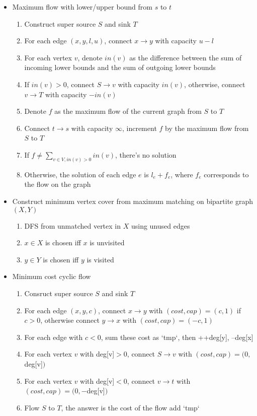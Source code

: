 \begin{itemize}
    \item Maximum flow with lower/upper bound from $s$ to $t$
    \begin{enumerate}
        \item Construct super source $S$ and sink $T$
        \item For each edge $(x, y, l, u)$, connect $x \rightarrow y$ with capacity $u - l$
        \item For each vertex $v$, denote $in(v)$ as the difference between the sum of incoming lower bounds and the sum of outgoing lower bounds
        \item If $in(v) > 0$, connect $S \rightarrow v$ with capacity $in(v)$, otherwise, connect $v \rightarrow T$ with capacity $-in(v)$
        \item Denote $f$ as the maximum flow of the current graph from $S$ to $T$
        \item Connect $t \rightarrow s$ with capacity $\infty$, increment $f$ by the maximum flow from $S$ to $T$
        \item If $f \neq \sum_{v \in V, in(v) > 0}{in(v)}$, there's no solution
        \item Otherwise, the solution of each edge $e$ is $l_e + f_e$, where $f_e$ corresponds to the flow on the graph
    \end{enumerate}
    \item Construct minimum vertex cover from maximum matching on bipartite graph $(X, Y)$
    \begin{enumerate}
        \item DFS from unmatched vertex in $X$ using unused edges
        \item $x \in X$ is chosen iff $x$ is unvisited
        \item $y \in Y$ is chosen iff $y$ is visited
    \end{enumerate}
    \item Minimum cost cyclic flow
    \begin{enumerate}
        \item Consruct super source $S$ and sink $T$
        \item For each edge $(x, y, c)$, connect $x \rightarrow y$ with $(cost, cap) = (c, 1)$ if $c > 0$, otherwise connect $y \rightarrow x$ with $(cost, cap) = (-c, 1)$
        \item For each edge with $c < 0$, sum these cost as `tmp`, then ++deg[y], --deg[x]
        \item For each vertex $v$ with deg[v]$> 0$, connect $S \rightarrow v$ with $(cost, cap) = (0, $deg[v]$)$
        \item For each vertex $v$ with deg[v]$< 0$, connect $v \rightarrow t$ with $(cost, cap) = (0, -$deg[v]$)$
        \item Flow $S$ to $T$, the answer is the cost of the flow add `tmp`
    \end{enumerate}
\end{itemize}
